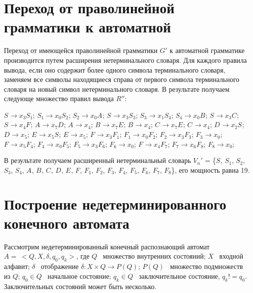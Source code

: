 \documentclass[a4paper,14pt,russian]{extarticle} %
\begin{document}
\section {Переход от праволинейной грамматики к автоматной}
Переход от имеющейся праволинейной грамматики \(G'\) к автоматной грамматике производится путем расширения нетерминального словаря. Для каждого правила вывода, если оно содержит более одного символа терминального словаря, заменяем все символы находящиеся справа от первого символа терминального словаря на новый символ нетерминального словаря. В результате получаем следующе множество правил вывода \(R''\):
\begin{center}
	\({S_{}}\rightarrow{{x_{3}} {S_{1}}}\);
	\({S_{1}}\rightarrow{{x_{0}} {S_{2}}}\);
	\({S_{2}}\rightarrow{{x_{0}} {A_{}}}\);
	\({S_{}}\rightarrow{{x_{3}} {S_{3}}}\);
	\({S_{3}}\rightarrow{{x_{1}} {S_{4}}}\);
	\({S_{4}}\rightarrow{{x_{0}} {B_{}}}\);
	\({S_{}}\rightarrow{{x_{3}} {C_{}}}\);
	\({S_{}}\rightarrow{{x_{4}} {F_{}}}\);
	\({A_{}}\rightarrow{{x_{7}} {D_{}}}\);
	\({A_{}}\rightarrow{{x_{4}}}\);
	\({B_{}}\rightarrow{{x_{7}} {E_{}}}\);
	\({B_{}}\rightarrow{{x_{4}}}\);
	\({C_{}}\rightarrow{{x_{7}} {E_{}}}\);
	\({C_{}}\rightarrow{{x_{4}}}\);
	\({D_{}}\rightarrow{{x_{2}} {S_{}}}\);
	\({D_{}}\rightarrow{{x_{5}}}\);
	\({E_{}}\rightarrow{{x_{5}} {S_{}}}\);
	\({E_{}}\rightarrow{{x_{5}}}\);
	\({F_{}}\rightarrow{{x_{3}} {F_{1}}}\);
	\({F_{1}}\rightarrow{{x_{0}} {F_{2}}}\);
	\({F_{2}}\rightarrow{{x_{3}} {F_{3}}}\);
	\({F_{3}}\rightarrow{{x_{0}}}\);
	\({F_{}}\rightarrow{{x_{5}} {F_{4}}}\);
	\({F_{4}}\rightarrow{{x_{0}} {F_{5}}}\);
	\({F_{5}}\rightarrow{{x_{3}} {F_{6}}}\);
	\({F_{6}}\rightarrow{{x_{0}}}\);
	\({F_{}}\rightarrow{{x_{4}} {F_{7}}}\);
	\({F_{7}}\rightarrow{{x_{6}} {F_{8}}}\);
	\({F_{8}}\rightarrow{{x_{0}}}\);
\end{center}
В результате получаем расширенный нетерминальный словарь \(V_n'\) = \{\({S_{}}\), \({S_{1}}\), \({S_{2}}\), \({S_{3}}\), \({S_{4}}\), \({A_{}}\), \({B_{}}\), \({C_{}}\), \({D_{}}\), \({E_{}}\), \({F_{}}\), \({F_{1}}\), \({F_{2}}\), \({F_{3}}\), \({F_{4}}\), \({F_{5}}\), \({F_{6}}\), \({F_{7}}\), \({F_{8}}\)\}, 
его мощность равна 19.

\section {Построение недетерминированного конечного автомата}
Рассмотрим недетерминированный конечный распознающий автомат \( A = \ <Q, X, \delta, q_0, q_k>\), где \(Q\) \textendash\ множество внутренних состояний; \(X\) \textendash\ входной алфавит; \(\delta\) \textendash\ отображение \(\delta:X\times Q\rightarrow P(Q)\); \(P(Q)\) \textendash\ множество подмножеств из \(Q\);  \(q_0 \in Q \)  \textendash\ начальное состояние; \(q_k \in Q \) \textendash\ заключительное состояние, \(q_k != q_0\). Заключительных состояний может быть несколько. 
\end{document}
